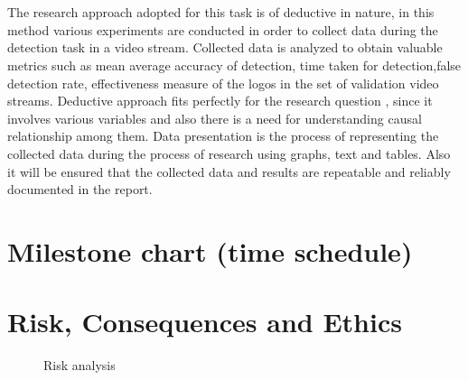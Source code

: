   \\\\
  The research approach adopted for this task is of deductive in nature, in this method various experiments are conducted in order to collect data during the detection task in a video stream. Collected data is analyzed to obtain valuable metrics such as mean average accuracy of detection, time taken for detection,false detection rate, effectiveness measure of the logos in the set of validation video streams. Deductive approach fits perfectly for the research question , since it involves various variables and also there is a need for understanding causal relationship among them.    
  Data presentation is the process of representing the collected data during the process of research using graphs, text and tables. Also it will be ensured that the collected data and results are repeatable and reliably documented in the report.  
 
 
\section{Milestone chart (time schedule)}
\pagebreak
 
 \begin{figure}[htp] \centering{
 
 }	
 \end{figure}

\pagebreak
 
 \begin{figure}[htp] \centering{
  
  }	
 \end{figure}

\pagebreak
  
 \begin{figure}[htp] \centering{
  
  }	
 \end{figure}
 
\pagebreak 
  \begin{figure}[htp] \centering{
   
   }	
  \end{figure}

\newpage
 
\section{Risk, Consequences and Ethics}
 \begin{figure}[htp] 
 \caption{Risk analysis}\label{fig:risk}
 \end{figure}

